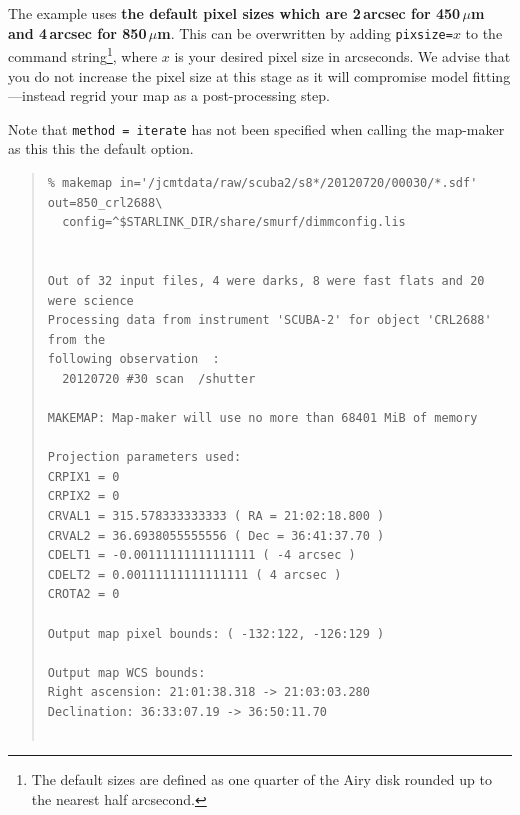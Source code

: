 \documentclass[twoside,11pt]{article}
\renewcommand{\_}{\texttt{\symbol{95}}}
\newenvironment{myquote}{\begin{quote}\begin{small}}{\end{small}\end{quote}}
\begin{document}
The example uses \textbf{the
default pixel sizes which are 2\,arcsec for 450\,$\mu$m and 4\,arcsec for
850\,$\mu$m}. This can be overwritten by adding \texttt{pixsize=}$x$ to the
command string\footnote{The default sizes are defined as one quarter
of the Airy disk rounded up to the nearest half arcsecond.}, where $x$
is your desired pixel size in arcseconds. We advise that you do not
increase the pixel size at this stage as it will compromise model
fitting---instead regrid your map as a post-processing step.

Note that \texttt{method = iterate} has not been specified when
calling the map-maker as this this the default option.

\begin{myquote}
\begin{verbatim}
% makemap in='/jcmtdata/raw/scuba2/s8*/20120720/00030/*.sdf' out=850_crl2688\
  config=^$STARLINK_DIR/share/smurf/dimmconfig.lis


Out of 32 input files, 4 were darks, 8 were fast flats and 20 were science
Processing data from instrument 'SCUBA-2' for object 'CRL2688' from the
following observation  :
  20120720 #30 scan  /shutter

MAKEMAP: Map-maker will use no more than 68401 MiB of memory

Projection parameters used:
CRPIX1 = 0
CRPIX2 = 0
CRVAL1 = 315.578333333333 ( RA = 21:02:18.800 )
CRVAL2 = 36.6938055555556 ( Dec = 36:41:37.70 )
CDELT1 = -0.00111111111111111 ( -4 arcsec )
CDELT2 = 0.00111111111111111 ( 4 arcsec )
CROTA2 = 0

Output map pixel bounds: ( -132:122, -126:129 )

Output map WCS bounds:
Right ascension: 21:01:38.318 -> 21:03:03.280
Declination: 36:33:07.19 -> 36:50:11.70


\end{verbatim}
\end{myquote}
\end{document}
